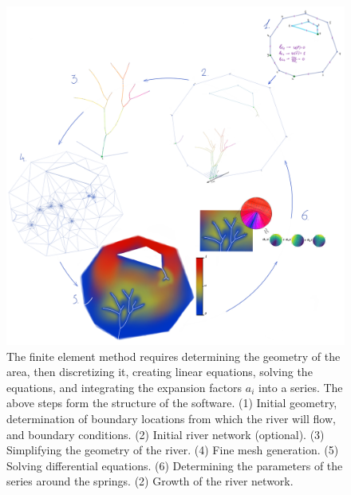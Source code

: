 \documentclass[]{pracamgr}
\begin{document}
    \begin{figure}[H]
      \centering
      \includegraphics[width=1\textwidth]{figs/ProgramWorkflowMainIllustration.jpg}
      \caption{The finite element method requires determining the geometry of the area, then discretizing it, creating linear equations, solving the equations, and integrating the expansion factors $a_i$ into a series. The above steps form the structure of the software. (1) Initial geometry, determination of boundary locations from which the river will flow, and boundary conditions. (2) Initial river network (optional). (3) Simplifying the geometry of the river. (4) Fine mesh generation. (5) Solving differential equations. (6) Determining the parameters of the series around the springs. (2) Growth of the river network.}
      \label{program_workflow}
    \end{figure}
      
\end{document}
